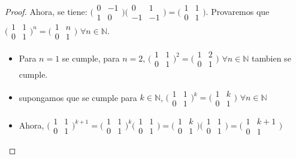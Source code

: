 \documentclass{article}
\theoremstyle{break}
\begin{document}
\begin{enumerate}
\begin{proof}
			Ahora, se tiene: $\bigl(\begin{smallmatrix}0&-1\\1&0\end{smallmatrix}\bigr)\bigl(\begin{smallmatrix}0&1\\-1&-1\end{smallmatrix}\bigr)=\bigl(\begin{smallmatrix}1&1\\0&1\end{smallmatrix}\bigr)$. Provaremos que $\bigl(\begin{smallmatrix}1&1\\0&1\end{smallmatrix}\bigr)^n=\bigl(\begin{smallmatrix}1&n\\0&1\end{smallmatrix}\bigr)$ $\forall n\in\mathbb{N}$.
			
			
			\begin{itemize}
				\item Para $n=1$ se cumple, para $n=2$, $\bigl(\begin{smallmatrix}1&1\\0&1\end{smallmatrix}\bigr)^2=\bigl(\begin{smallmatrix}1&2\\0&1\end{smallmatrix}\bigr)$ $\forall n\in\mathbb{N}$ tambien se cumple.
				
				\item supongamos que se cumple para  $k\in\mathbb{N}$, $\bigl(\begin{smallmatrix}1&1\\0&1\end{smallmatrix}\bigr)^k=\bigl(\begin{smallmatrix}1&k\\0&1\end{smallmatrix}\bigr)$ $\forall n\in\mathbb{N}$
				
				\item Ahora, $\bigl(\begin{smallmatrix}1&1\\0&1\end{smallmatrix}\bigr)^{k+1}=\bigl(\begin{smallmatrix}1&1\\0&1\end{smallmatrix}\bigr)^k \bigl(\begin{smallmatrix}1&1\\0&1\end{smallmatrix}\bigr)  =\bigl(\begin{smallmatrix}1&k\\0&1\end{smallmatrix}\bigr)\bigl(\begin{smallmatrix}1&1\\0&1\end{smallmatrix}\bigr)=\bigl(\begin{smallmatrix}1&k+1\\0&1\end{smallmatrix}\bigr)$ 
				

\end{itemize}
\end{proof}
\end{enumerate}
\end{document}
